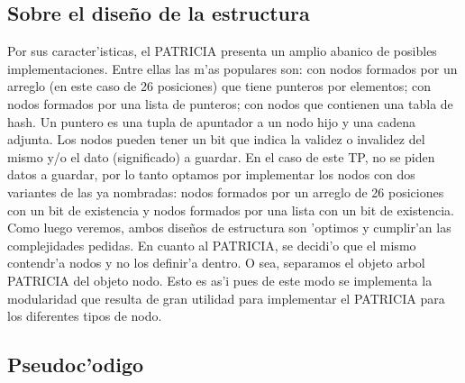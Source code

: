 \subsection{Sobre el dise\~{n}o de la estructura}
Por sus caracter'isticas, el PATRICIA presenta un amplio abanico de posibles implementaciones. Entre ellas las m'as populares son: con nodos formados por un arreglo (en este caso de 26 posiciones) que tiene punteros por elementos; con nodos formados por una lista de punteros; con nodos que contienen una tabla de hash. Un puntero es una tupla de apuntador a un nodo hijo y una cadena adjunta. Los nodos pueden tener un bit que indica la validez o invalidez del mismo y/o el dato (significado) a guardar. En el caso de este TP, no se piden datos a guardar, por lo tanto optamos por implementar los nodos con dos variantes de las ya nombradas: nodos formados por un arreglo de 26 posiciones con un bit de existencia y nodos formados por una lista con un bit de existencia. Como luego veremos, ambos dise\~{n}os de estructura son 'optimos y cumplir'an las complejidades pedidas.
En cuanto al PATRICIA, se decidi'o que el mismo contendr'a nodos y no los definir'a dentro. O sea, separamos el objeto arbol PATRICIA del objeto nodo. Esto es as'i pues de este modo se implementa la modularidad que resulta de gran utilidad para implementar el PATRICIA para los diferentes tipos de nodo.

\subsection{Pseudoc'odigo}

